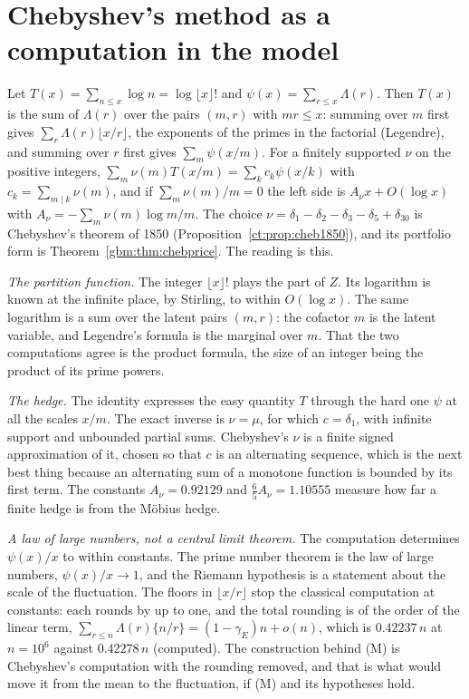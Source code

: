 \section{Chebyshev's method as a computation in the model}\label{lvz:sec:cheb}

Let $T(x)=\sum_{n\le x}\log n=\log\lfloor x\rfloor!$ and $\psi(x)=\sum_{r\le x}\Lambda(r)$. Then $T(x)$ is the sum of $\Lambda(r)$ over the pairs $(m,r)$ with $mr\le x$: summing over $m$ first gives $\sum_r\Lambda(r)\lfloor x/r\rfloor$, the exponents of the primes in the factorial (Legendre), and summing over $r$ first gives $\sum_m\psi(x/m)$. For a finitely supported $\nu$ on the positive integers, $\sum_m\nu(m)T(x/m)=\sum_kc_k\psi(x/k)$ with $c_k=\sum_{m\mid k}\nu(m)$, and if $\sum_m\nu(m)/m=0$ the left side is $A_\nu x+O(\log x)$ with $A_\nu=-\sum_m\nu(m)\log m/m$. The choice $\nu=\delta_1-\delta_2-\delta_3-\delta_5+\delta_{30}$ is Chebyshev's theorem of 1850 (Proposition~\ref{ct:prop:cheb1850}), and its portfolio form is Theorem~\ref{gbm:thm:chebprice}. The reading is this.

\emph{The partition function.} The integer $\lfloor x\rfloor!$ plays the part of $Z$. Its logarithm is known at the infinite place, by Stirling, to within $O(\log x)$. The same logarithm is a sum over the latent pairs $(m,r)$: the cofactor $m$ is the latent variable, and Legendre's formula is the marginal over $m$. That the two computations agree is the product formula, the size of an integer being the product of its prime powers.

\emph{The hedge.} The identity expresses the easy quantity $T$ through the hard one $\psi$ at all the scales $x/m$. The exact inverse is $\nu=\mu$, for which $c=\delta_1$, with infinite support and unbounded partial sums. Chebyshev's $\nu$ is a finite signed approximation of it, chosen so that $c$ is an alternating sequence, which is the next best thing because an alternating sum of a monotone function is bounded by its first term. The constants $A_\nu=0.92129$ and $\frac65A_\nu=1.10555$ measure how far a finite hedge is from the M\"obius hedge.

\emph{A law of large numbers, not a central limit theorem.} The computation determines $\psi(x)/x$ to within constants. The prime number theorem is the law of large numbers, $\psi(x)/x\to1$, and the Riemann hypothesis is a statement about the scale of the fluctuation. The floors in $\lfloor x/r\rfloor$ stop the classical computation at constants: each rounds by up to one, and the total rounding is of the order of the linear term, $\sum_{r\le n}\Lambda(r)\{n/r\}=(1-\gamma_E)n+o(n)$, which is $0.42237\,n$ at $n=10^6$ against $0.42278\,n$ (computed). The construction behind (M) is Chebyshev's computation with the rounding removed, and that is what would move it from the mean to the fluctuation, if (M) and its hypotheses hold.

